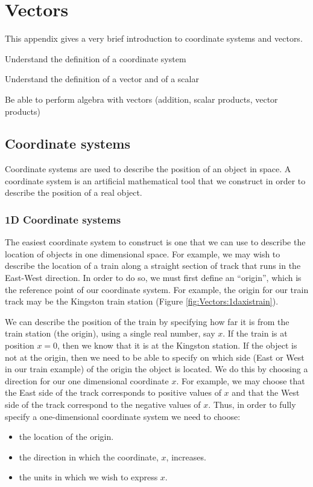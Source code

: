 \chapter{Vectors}
\label{app:vectors}
This appendix gives a very brief introduction to coordinate systems and vectors.
 \vspace{1cm}
\begin{learningObjectives}{
\item Understand the definition of a coordinate system
\item Understand the definition of a vector and of a scalar
\item Be able to perform algebra with vectors (addition, scalar products, vector products)}
\end{learningObjectives}

\section{Coordinate systems}
Coordinate systems are used to describe the position of an object in space. A coordinate system is an artificial mathematical tool that we construct in order to describe the position of a real object. 

\subsection{1D Coordinate systems} 
The easiest coordinate system to construct is one that we can use to describe the location of objects in one dimensional space. For example, we may wish to describe the location of a train along a straight section of track that runs in the East-West direction. In order to do so, we must first define an ``origin'', which is the reference point of our coordinate system. For example, the origin for our train track may be the Kingston train station (Figure \ref{fig:Vectors:1daxistrain}).

We can describe the position of the train by specifying how far it is from the train station (the origin), using a single real number, say $x$. If the train is at position $x=0$, then we know that it is at the Kingston station. If the object is not at the origin, then we need to be able to specify on which side (East or West in our train example) of the origin the object is located. We do this by choosing a direction for our one dimensional coordinate $x$. For example, we may choose that the East side of the track corresponds to positive values of $x$ and that the West side of the track correspond to the negative values of $x$. Thus, in order to fully specify a one-dimensional coordinate system we need to choose:
\begin{itemize}
\item the location of the origin.
\item the direction in which the coordinate, $x$, increases.
\item the units in which we wish to express $x$.
\end{itemize} 

